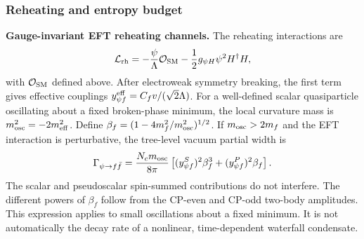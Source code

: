 \documentclass[epj]{svjour}
\begin{document}
\subsubsection{Reheating and entropy budget}
\label{sec:entropy_budget}

\noindent\textbf{Gauge-invariant EFT reheating channels.}
The reheating interactions are
\[
\mathcal L_{\rm rh}
=-\frac{\psi}{\Lambda}\mathcal O_{\rm SM}
-\frac12g_{\psi H}\psi^2H^\dagger H,
\]
with $\mathcal O_{\rm SM}$ defined above. After electroweak
symmetry breaking, the first term gives effective couplings
$y_{\psi f}^{\rm eff}=C_fv/(\sqrt2\Lambda)$. For a well-defined
scalar quasiparticle oscillating about a fixed broken-phase
minimum, the local curvature mass is
$m_{\rm osc}^2=-2m_{\rm eff}^2$. Define
$\beta_f=(1-4m_f^2/m_{\rm osc}^2)^{1/2}$. If
$m_{\rm osc}>2m_f$ and the EFT interaction is perturbative, the
tree-level vacuum partial width is
\begin{equation}
\Gamma_{\psi\to f\bar f}=
\frac{N_c m_{\rm osc}}{8\pi}
\left[(y^S_{\psi f})^2\beta_f^3
+(y^P_{\psi f})^2\beta_f\right].
\label{eq:ptum_broken_phase_decay_width}
\end{equation}
The scalar and pseudoscalar spin-summed contributions do not
interfere. The different powers of $\beta_f$ follow from the
CP-even and CP-odd two-body amplitudes. This expression applies to
small oscillations about a fixed minimum. It is not automatically
the decay rate of a nonlinear, time-dependent waterfall condensate.
\end{document}
